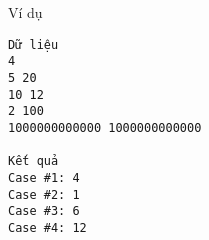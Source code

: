 Ví dụ
\begin{verbatim}
Dữ liệu
4
5 20
10 12
2 100
1000000000000 1000000000000

Kết quả
Case #1: 4
Case #2: 1
Case #3: 6
Case #4: 12
\end{verbatim}